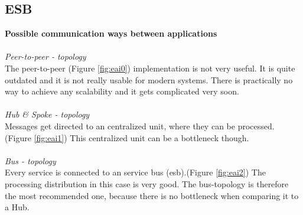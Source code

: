 \documentclass[12pt]{article}
\begin{document}
\subsection{ESB}
\label{sec:esb}
\textbf{Possible communication ways between applications} \\ \\
\textit{Peer-to-peer - topology}\\
The peer-to-peer (Figure \ref{fig:eai0}) implementation is not very useful. It is quite outdated and it is not really usable for modern systems.
There is practically no way to achieve any scalability and it gets complicated very soon. \\\\
\textit{Hub \& Spoke  - topology}\\
Messages get directed to an centralized unit, where they can be processed. (Figure \ref{fig:eai1}) This centralized unit can be a bottleneck though. \\\\
\textit{Bus - topology}\\
Every service is connected to an service bus (\gls{esb}).(Figure \ref{fig:eai2}) The processing distribution in this case is very good. The bus-topology is therefore the most recommended one, because there is no bottleneck when comparing it to a Hub.
\end{document}
